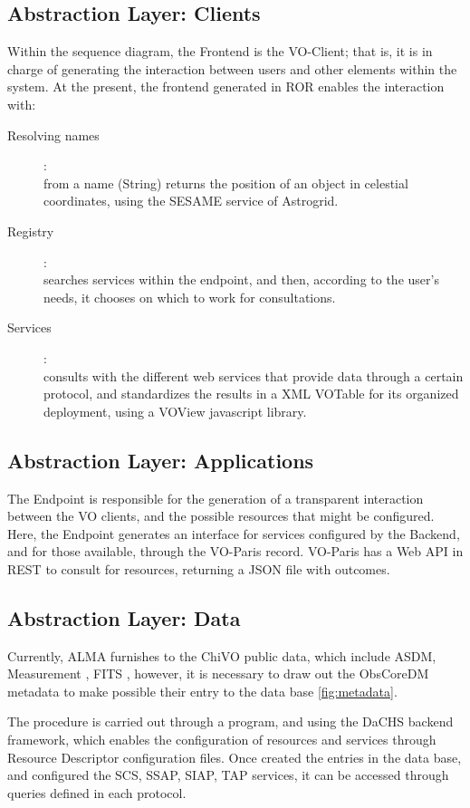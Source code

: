 \documentclass[]{spie}
\begin{document}
\subsection{Abstraction Layer:  Clients}
Within the sequence diagram, the Frontend is the VO-Client; that is, it is in charge of generating the interaction between users and other elements within the system.
At the present, the frontend generated in ROR enables the interaction with:
\begin{description}
    \item[Resolving names]:\hfill \\
        from a name (String) returns the position of an object in celestial coordinates, using the SESAME service of Astrogrid.
    \item[Registry]: \hfill \\
        searches services within the endpoint, and then, according to the user's needs, it chooses on which to work for consultations.
    \item[Services]: \hfill \\
        consults with the different web services that provide data through a certain protocol, and standardizes the results in a XML VOTable for its organized deployment, using a VOView javascript library.
\end{description}

\subsection{Abstraction Layer:  Applications}
The Endpoint is responsible for the generation of a transparent interaction between the VO clients, and the possible resources that might be configured.  Here, the Endpoint generates an interface for services configured by the Backend, and for those available, through the VO-Paris record.  VO-Paris has a Web API in REST to consult for resources, returning a JSON file with outcomes.

\subsection{Abstraction Layer:  Data}
Currently, ALMA furnishes to the ChiVO public data, which include ASDM, Measurement \cite{petry2012analysing}, FITS \cite{wells1981fits}, however, it is necessary to draw out the ObsCoreDM metadata to make possible their entry to the data base \ref{fig:metadata}.

The procedure is carried out through a program, and using the DaCHS backend framework, which enables the configuration of resources and services through Resource Descriptor  configuration files.  Once created the entries in the data base, and configured the SCS, SSAP, SIAP, TAP services, it can be accessed through queries defined in each protocol.
\end{document}
